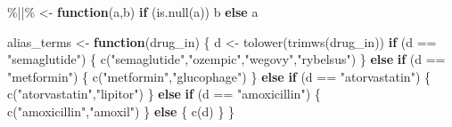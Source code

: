 \documentclass[
  letterpaper,
  DIV=11,
  numbers=noendperiod]{scrartcl}
\newenvironment{Shaded}{\begin{snugshade}}{\end{snugshade}}
\newcommand{\AttributeTok}[1]{\textcolor[rgb]{0.40,0.45,0.13}{#1}}
\newcommand{\ControlFlowTok}[1]{\textcolor[rgb]{0.00,0.23,0.31}{\textbf{#1}}}
\newcommand{\FunctionTok}[1]{\textcolor[rgb]{0.28,0.35,0.67}{#1}}
\newcommand{\NormalTok}[1]{\textcolor[rgb]{0.00,0.23,0.31}{#1}}
\newcommand{\OtherTok}[1]{\textcolor[rgb]{0.00,0.23,0.31}{#1}}
\newcommand{\SpecialCharTok}[1]{\textcolor[rgb]{0.37,0.37,0.37}{#1}}
\newcommand{\StringTok}[1]{\textcolor[rgb]{0.13,0.47,0.30}{#1}}
\begin{document}
\begin{Shaded}
\begin{Highlighting}[]
\StringTok{\textasciigrave{}}\AttributeTok{\%||\%}\StringTok{\textasciigrave{}} \OtherTok{\textless{}{-}} \ControlFlowTok{function}\NormalTok{(a,b) }\ControlFlowTok{if}\NormalTok{ (}\FunctionTok{is.null}\NormalTok{(a)) b }\ControlFlowTok{else}\NormalTok{ a}
\end{Highlighting}
\end{Shaded}

\begin{Shaded}
\begin{Highlighting}[]
\NormalTok{alias\_terms }\OtherTok{\textless{}{-}} \ControlFlowTok{function}\NormalTok{(drug\_in) \{}
\NormalTok{  d }\OtherTok{\textless{}{-}} \FunctionTok{tolower}\NormalTok{(}\FunctionTok{trimws}\NormalTok{(drug\_in))}
  \ControlFlowTok{if}\NormalTok{ (d }\SpecialCharTok{==} \StringTok{"semaglutide"}\NormalTok{) \{}
    \FunctionTok{c}\NormalTok{(}\StringTok{"semaglutide"}\NormalTok{,}\StringTok{"ozempic"}\NormalTok{,}\StringTok{"wegovy"}\NormalTok{,}\StringTok{"rybelsus"}\NormalTok{)}
\NormalTok{  \} }\ControlFlowTok{else} \ControlFlowTok{if}\NormalTok{ (d }\SpecialCharTok{==} \StringTok{"metformin"}\NormalTok{) \{}
    \FunctionTok{c}\NormalTok{(}\StringTok{"metformin"}\NormalTok{,}\StringTok{"glucophage"}\NormalTok{)}
\NormalTok{  \} }\ControlFlowTok{else} \ControlFlowTok{if}\NormalTok{ (d }\SpecialCharTok{==} \StringTok{"atorvastatin"}\NormalTok{) \{}
    \FunctionTok{c}\NormalTok{(}\StringTok{"atorvastatin"}\NormalTok{,}\StringTok{"lipitor"}\NormalTok{)}
\NormalTok{  \} }\ControlFlowTok{else} \ControlFlowTok{if}\NormalTok{ (d }\SpecialCharTok{==} \StringTok{"amoxicillin"}\NormalTok{) \{}
    \FunctionTok{c}\NormalTok{(}\StringTok{"amoxicillin"}\NormalTok{,}\StringTok{"amoxil"}\NormalTok{)}
\NormalTok{  \} }\ControlFlowTok{else}\NormalTok{ \{}
    \FunctionTok{c}\NormalTok{(d)}
\NormalTok{  \}}
\NormalTok{\}}
\end{Highlighting}
\end{Shaded}
\end{document}
